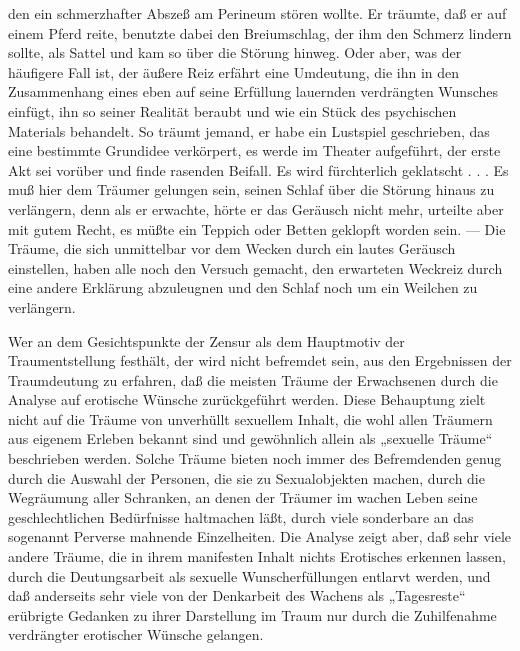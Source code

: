 \documentclass[twoside=true,titlepage=false,open=any, parskip=never, fontsize=10pt, headings=small, chapterprefix=false, appendixprefix=false]{scrbook}
\begin{document}
         
            
            
            
        \pstart
        den ein schmerzhafter Abszeß am Perineum stören wollte. Er träumte,
               daß er auf einem Pferd reite, benutzte dabei den Breiumschlag, der
               ihm den Schmerz lindern sollte, als Sattel und kam so über die Störung hinweg.
               Oder aber, was der häufigere Fall ist, der äußere Reiz erfährt eine Umdeutung,
               die ihn in den Zusammenhang eines eben auf seine Erfüllung lauernden
               verdrängten Wunsches einfügt, ihn so seiner Realität beraubt und wie ein Stück
               des psychischen Materials behandelt. So träumt jemand, er habe ein Lustspiel
               geschrieben, das eine bestimmte Grundidee verkörpert, es werde im Theater
               aufgeführt, der erste Akt sei vorüber und finde rasenden Beifall. Es wird
               fürchterlich geklatscht . . . Es muß hier dem Träumer gelungen sein, seinen
               Schlaf über die Störung hinaus zu verlängern, denn als er erwachte, hörte er das
               Geräusch nicht mehr, urteilte aber mit gutem Recht, es müßte ein Teppich oder
               Betten geklopft worden sein. — Die Träume, die sich unmittelbar vor dem
               Wecken durch ein lautes Geräusch einstellen, haben alle noch den Versuch
               gemacht, den erwarteten Weckreiz durch eine andere Erklärung abzuleugnen und den
               Schlaf noch um ein Weilchen zu verlängern.
        \pend
    
         
            
            
            \pstart{}\pend
            
        \pstart
        Wer an dem Gesichtspunkte der Zensur als dem Hauptmotiv der Traumentstellung festhält, der wird nicht befremdet
               sein, aus den Ergebnissen der Traumdeutung zu erfahren, daß die meisten Träume
               der Erwachsenen durch die Analyse auf
               erotische Wünsche zurückgeführt werden. Diese
               Behauptung zielt nicht auf die Träume von unverhüllt sexuellem Inhalt, die
               wohl allen Träumern aus eigenem Erleben bekannt sind und gewöhnlich allein als
               „sexuelle Träume“ beschrieben werden. Solche Träume bieten noch immer des
               Befremdenden genug durch die Auswahl der Personen, die sie zu
               Sexualobjekten machen, durch die Wegräumung aller Schranken, an denen der
               Träumer im wachen Leben seine geschlechtlichen Bedürfnisse haltmachen läßt,
               durch viele sonderbare an das sogenannt
               Perverse mahnende Einzelheiten. Die Analyse zeigt
               aber, daß sehr viele andere Träume, die in ihrem manifesten Inhalt nichts
               Erotisches erkennen lassen, durch die Deutungsarbeit als sexuelle
               Wunscherfüllungen entlarvt werden, und daß anderseits sehr viele von der
               Denkarbeit des Wachens als „Tagesreste“ erübrigte Gedanken zu ihrer
               Darstellung im Traum nur durch die Zuhilfenahme verdrängter
               erotischer Wünsche gelangen.
        \pend
    
\end{document}
